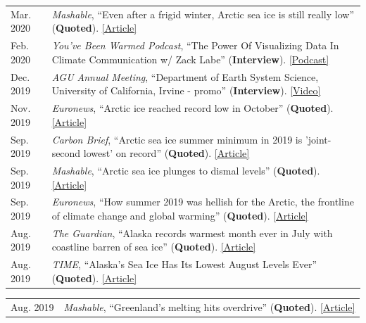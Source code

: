 \documentclass[margin,line,palatino,courier,10pt]{res}
\begin{document}
\begin{resume}
\begin{tabular}{@{}p{0.9in}p{4in}}
Mar. 2020 & \textit{Mashable}, ``Even after a frigid winter, Arctic sea ice is still really low'' (\textbf{Quoted}). \href{https://mashable.com/article/arctic-sea-ice-low-2020/}{[Article]}\\
Feb. 2020 & \textit{You’ve Been Warmed Podcast}, ``The Power Of Visualizing Data In Climate Communication w/ Zack Labe'' (\textbf{Interview}). \href{https://www.youvebeenwarmed.com/episodes/the-power-of-visualizing-data-in-climate-communication-w-zack-labe}{[Podcast]}\\
Dec. 2019 & \textit{AGU Annual Meeting}, ``Department of Earth System Science, University of California, Irvine - promo'' (\textbf{Interview}). \href{https://www.youtube.com/watch?v=QSDRbSkJeqg&feature=youtu.be}{[Video]}\\
Nov. 2019 & \textit{Euronews}, ``Arctic ice reached record low in October'' (\textbf{Quoted}). \href{https://www.euronews.com/2019/11/04/arctic-ice-reached-record-low-in-october}{[Article]}\\
Sep. 2019 & \textit{Carbon Brief}, ``Arctic sea ice summer minimum in 2019 is 'joint-second lowest' on record'' (\textbf{Quoted}). \href{https://www.carbonbrief.org/arctic-sea-ice-minimum-in-2019-is-joint-second-lowest-on-record}{[Article]}\\
Sep. 2019 & \textit{Mashable}, ``Arctic sea ice plunges to dismal levels'' (\textbf{Quoted}). \href{https://mashable.com/article/arctic-sea-ice-2019-melt/}{[Article]}\\
Sep. 2019 & \textit{Euronews}, ``How summer 2019 was hellish for the Arctic, the frontline of climate change and global warming'' (\textbf{Quoted}). \href{https://www.euronews.com/2019/09/18/how-2019-was-hellish-for-the-arctic-the-frontline-of-climate-change-and-global-warming}{[Article]}\\
Aug. 2019 & \textit{The Guardian}, ``Alaska records warmest month ever in July with coastline barren of sea ice'' (\textbf{Quoted}). \href{https://www.theguardian.com/us-news/2019/aug/08/alaska-warmest-month-ever-july-2019-sea-ice}{[Article]}\\
Aug. 2019 & \textit{TIME}, ``Alaska's Sea Ice Has Its Lowest August Levels Ever'' (\textbf{Quoted}). \href{https://time.com/5646168/alaska-sea-ice-melted/}{[Article]}\\
\end{tabular}
\begin{tabular}{@{}p{0.9in}p{4in}}
Aug. 2019 & \textit{Mashable}, ``Greenland's melting hits overdrive'' (\textbf{Quoted}). \href{https://mashable.com/article/greenland-melting-spike-climate-change/}{[Article]}\\

\end{tabular}
\end{resume}
\end{document}
